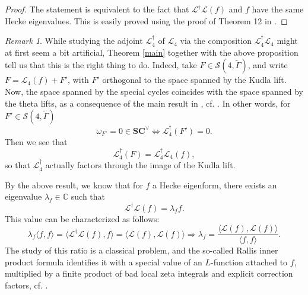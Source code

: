 \documentclass[12pt,a4paper,reqno]{amsart}
\theoremstyle{definition}
\numberwithin{definition}{subsection}
\theoremstyle{definition}
\numberwithin{Definition}{subsection}
\theoremstyle{remark}
\theoremstyle{remark}
\newtheorem{Remark}{Remark}
\numberwithin{Remark}{subsection}
\theoremstyle{remark}
\theoremstyle{plain}
\numberwithin{Theorem}{subsection}
\theoremstyle{plain}
\theoremstyle{plain}
\theoremstyle{plain}
\theoremstyle{plain}
\theoremstyle{plain}
\theoremstyle{plain}
\theoremstyle{plain}
\newcommand*{\Cc}{\mathbb{C}}
\begin{document}
\begin{proof}
The statement is equivalent to the fact that $\mathcal{L}^\dagger \mathcal{L}(f)$ and $f$ have the same Hecke eigenvalues. This is easily proved using the proof of Theorem 12 in \cite{iudica}.
\end{proof}

\begin{Remark}
While studying the adjoint $\mathcal{L}_4^\dagger$ of $\mathcal{L}_4$ via the composition $\mathcal{L}_4^\dagger\mathcal{L}_4$ might at first seem a bit artificial, Theorem \ref{main} together with the above proposition tell us that this is the right thing to do. Indeed, take $F\in \mathscr{S}(4,\tilde{\Gamma})$, and write $F=\mathcal{L}_4(f)+F'$, with $F'$ orthogonal to the space spanned by the Kudla lift. Now, the space spanned by the special cycles coincides with the space spanned by the theta lifts, as a consequence of the main result in \cite[p. 468]{tongwang}, cf. \cite[p. 214]{soudry}. In other words, for $F'\in \mathscr{S}(4,\tilde{\Gamma})$ $$\omega_{F'}=0\in \textbf{SC}^\vee \Leftrightarrow\mathcal{L}_4^\dagger(F')=0.$$ 
Then we see that
\[
\mathcal{L}^\dagger_4(F)=\mathcal{L}_4^\dagger\mathcal{L}_4(f),
\]
so that $\mathcal{L}_4^\dagger$ actually factors through the image of the Kudla lift.
\end{Remark}

By the above result, we know that for $f$ a Hecke eigenform, there exists an eigenvalue $\lambda_f\in \Cc$ such that
\[
\mathcal{L}^\dagger \mathcal{L}(f)=\lambda_f f.
\]
This value can be characterized as follows:
\[
\lambda_f\langle f,f\rangle=\langle \mathcal{L}^\dagger \mathcal{L}(f),f\rangle=\langle \mathcal{L}(f),\mathcal{L}(f)\rangle\Rightarrow \lambda_f=\frac{\langle \mathcal{L}(f),\mathcal{L}(f)\rangle}{\langle f,f\rangle}.
\]
The study of this ratio is a classical problem, and the so-called Rallis inner product formula identifies it with a special value of an $L$-function attached to $f$, multiplied by a finite product of bad local zeta integrals and explicit correction factors, cf. \cite[p. 226]{harris}.
\end{document}
